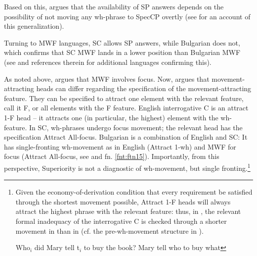 \documentclass[output=paper,colorlinks,citecolor=brown]{langscibook}
\begin{document}
\noindent Based on this, \citet{Bošković2003,Bošković2002} argues that the availability of SP answers depends on the possibility of not moving any wh-phrase to SpecCP overtly (see \citealt{Bošković2003} for an account of this generalization).

Turning to MWF languages, SC allows SP answers, while Bulgarian does not, which confirms that SC MWF lands in a lower position than Bulgarian MWF (see \citealt{Bošković2007} and references therein for additional languages confirming this).

As noted above, \citet{Bošković2002} argues that MWF involves focus. Now, \citet{Bošković1999} argues that movement-attracting heads can differ regarding the specification of the movement-attracting feature. They can be specified to attract one element with the relevant feature, call it F, or all elements with the F feature. English interrogative C is an attract 1-F head -- it attracts one (in particular, the highest) element with the wh-feature. In SC, wh-phrases undergo focus movement; the relevant head has the specification Attract All-focus. Bulgarian is a combination of English and SC: It has single-fronting wh-movement as in English (Attract 1-wh) and MWF for focus (Attract All-focus, see \citealt{Bošković1999} and fn. \ref{fnt:ftn15}). Importantly, from this perspective, Superiority is not a diagnostic of wh-movement, but single fronting.\footnote{\label{fnt:ftn14}Given the economy-of-derivation condition that every requirement be satisfied through the shortest movement possible, Attract 1-F heads will always attract the highest phrase with the relevant feature: thus, in , the relevant formal inadequacy of the interrogative C is checked through a shorter movement in  than in  (cf. the pre-wh-movement structure in ).

\ea\label{ex:bosk:fnMary} 
\ea Who$_i$ did Mary tell t$_i$ to buy the book? \label{ex:bosk:fnMarya}    
     \label{ex:bosk:fnMaryb}
\ex Mary tell who to buy what\label{ex:bosk:fnMaryc}
\z 
\z 

}
\end{document}

